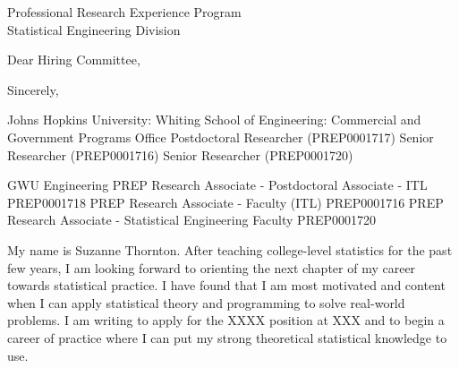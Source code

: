 \documentclass[11pt,a4paper,sans]{moderncv}
\begin{document}
	
	{Professional Research Experience Program\\
	Statistical Engineering Division}
	\date{\today }
	\opening{Dear Hiring Committee,}
	\closing{Sincerely,}
	\makelettertitle
	

	Johns Hopkins University: Whiting School of Engineering: Commercial and Government Programs Office
	Postdoctoral Researcher (PREP0001717)
	Senior Researcher (PREP0001716)
	Senior Researcher (PREP0001720)
	
	GWU Engineering	
	PREP Research Associate - Postdoctoral Associate - ITL PREP0001718
	PREP Research Associate - Faculty (ITL) PREP0001716
	PREP Research Associate - Statistical Engineering Faculty PREP0001720
	
	My name is Suzanne Thornton. After teaching college-level statistics for the past few years, I am looking forward to orienting the next chapter of my career towards statistical practice. I have found that I am most motivated and content when I can apply statistical theory and programming to solve real-world problems. I am writing to apply for the XXXX position at XXX and to begin a career of practice where I can put my strong theoretical statistical knowledge to use.\\ \vspace{.5cm}
\end{document}

